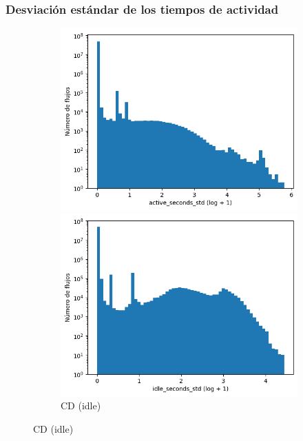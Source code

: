 \subsubsection{Desviación estándar de los tiempos de actividad}

\begin{figure}[H]
    \centering
    \begin{subfigure}[b]{0.26\textwidth}
        \centering
        \includegraphics[width=\textwidth]{media/packet_pincer_cicddos/active_seconds_std_log_x_log_y.png}
        \caption{CD (active)}
        \includegraphics[width=\textwidth]{media/packet_pincer_cicddos/idle_seconds_std_log_x_log_y.png}
        \caption{CD (idle)}

\end{subfigure}
\end{figure}
